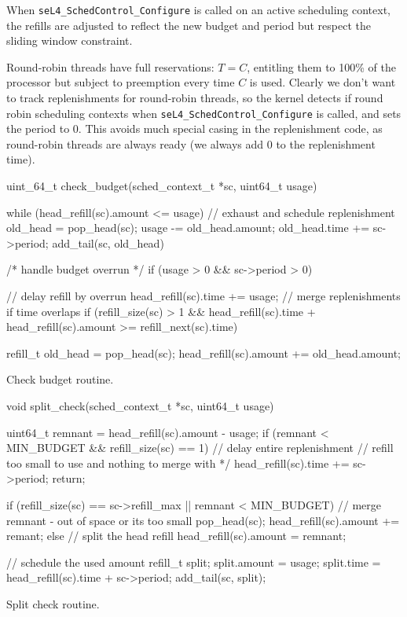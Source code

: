When \texttt{seL4\_SchedControl\_Configure} is called on an active scheduling context, the refills are adjusted to reflect the new budget and period but respect the sliding window constraint.

Round-robin threads have full reservations: $T = C$, entitling them to 100\% of the processor but subject to preemption every time $C$ is used.
Clearly we don't want to track replenishments for round-robin threads, so the kernel detects if round robin scheduling contexts when \texttt{seL4\_SchedControl\_Configure} is called, and sets the period to 0.
This avoids much special casing in the replenishment code, as round-robin threads are always ready (we always add 0 to the replenishment time).

\begin{listing}[b]
\begin{ccode}

uint_64_t check_budget(sched_context_t *sc, uint64_t usage) {
  while (head_refill(sc).amount <= usage) {
    // exhaust and schedule replenishment
    old_head = pop_head(sc);
    usage -= old_head.amount;
    old_head.time += sc->period;
    add_tail(sc, old_head)
  }

  /* handle budget overrun */
  if (usage > 0 && sc->period > 0) {
    // delay refill by overrun
    head_refill(sc).time += usage;
    // merge replenishments if time overlaps
    if (refill_size(sc) > 1 &&
        head_refill(sc).time + head_refill(sc).amount
        >= refill_next(sc).time) {

      refill_t old_head = pop_head(sc);
      head_refill(sc).amount += old_head.amount;
    }
  }
}
\end{ccode}
\caption{Check budget routine.}
\label{list:check-budget}
\end{listing}

\begin{listing}
    \begin{ccode}
void split_check(sched_context_t *sc, uint64_t usage) {
  uint64_t remnant = head_refill(sc).amount - usage;
  if (remnant < MIN_BUDGET && refill_size(sc) == 1) {
    // delay entire replenishment
    // refill too small to use and nothing to merge with */
    head_refill(sc).time += sc->period;
    return;
  }

  if (refill_size(sc) == sc->refill_max || remnant < MIN_BUDGET) {
    // merge remnant - out of space or its too small
    pop_head(sc);
    head_refill(sc).amount += remant;
  } else {
    // split the head refill
    head_refill(sc).amount = remnant;
  }

  // schedule the used amount
  refill_t split;
  split.amount = usage;
  split.time = head_refill(sc).time + sc->period;
  add_tail(sc, split);
}
\end{ccode}
\caption{Split check routine.}
\label{list:split-check}
\end{listing}


